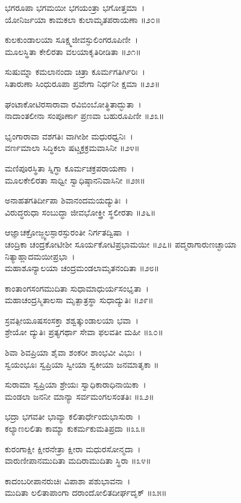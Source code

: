 	ಭಗರೂಪಾ ಭಗಮಯೀ ಭಗಯಂತ್ರಾ ಭಗೋತ್ತಮಾ~।\\
	ಯೋನಿರ್ಜಯಾ ಕಾಮಕಲಾ ಕುಲಾಮೃತಪರಾಯಣಾ ॥೨೦॥

ಕುಲಕುಂಡಾಲಯಾ ಸೂಕ್ಷ್ಮಜೀವಸ್ಫುಲಿಂಗರೂಪಿಣೀ~।\\
ಮೂಲಸ್ಥಿತಾ ಕೇಲಿರತಾ ವಲಯಾಕೃತಿರೀಡಿತಾ ॥೨೧॥

	ಸುಷುಮ್ನಾ ಕಮಲಾನಂದಾ ಚಿತ್ರಾ ಕೂರ್ಮಗತಿರ್ಗಿರಿಃ~।\\
	ಸಿತಾರುಣಾ ಸಿಂಧುರೂಪಾ ಪ್ರವೇಗಾ ನಿರ್ಧನೀ ಕ್ಷಮಾ ॥೨೨॥

ಘಂಟಾಕೋಟಿರಸಾರಾವಾ ರವಿಬಿಂಬೋತ್ಥಿತಾದ್ಭುತಾ~।\\
ನಾದಾಂತಲೀನಾ ಸಂಪೂರ್ಣಾ ಪ್ರಣವಾ ಬಹುರೂಪಿಣೀ ॥೨೩॥

	ಭೃಂಗಾರಾವಾ ವಶಗತಿಃ ವಾಗೀಶೀ ಮಧುರಧ್ವನಿಃ~।\\
	ವರ್ಣಮಾಲಾ ಸಿದ್ಧಿಕಲಾ ಷಟ್ಚಕ್ರಕ್ರಮವಾಸಿನೀ ॥೨೪॥

ಮಣಿಪೂರಸ್ಥಿತಾ ಸ್ನಿಗ್ಧಾ ಕೂರ್ಮಚಕ್ರಪರಾಯಣಾ~।\\
ಮೂಲಕೇಲಿರತಾ ಸಾಧ್ವೀ ಸ್ವಾಧಿಷ್ಠಾನನಿವಾಸಿನೀ ॥೨೫॥

	ಅನಾಹತಗತಿರ್ದೀಪಾ ಶಿವಾನಂದಮಯದ್ಯುತಿಃ~।\\
	ವಿರುದ್ಧರುಧಾ ಸಂಬುದ್ಧಾ ಜೀವಭೋಕ್ತ್ರೀ ಸ್ಥಲೀರತಾ ॥೨೬॥

ಆಜ್ಞಾಚಕ್ರೋಜ್ಜ್ವಲಸ್ಫಾರಸ್ಫುರಂತೀ ನಿರ್ಗತದ್ವಿಷಾ~।\\
ಚಂದ್ರಿಕಾ ಚಂದ್ರಕೋಟೀಶೀ ಸೂರ್ಯಕೋಟಿಪ್ರಭಾಮಯೀ ॥೨೭॥
\newpage
	ಪದ್ಮರಾಗಾರುಣಚ್ಛಾಯಾ ನಿತ್ಯಾಹ್ಲಾದಮಯೀಪ್ರಭಾ~।\\
	ಮಹಾಶೂನ್ಯಾಲಯಾ ಚಂದ್ರಮಂಡಲಾಮೃತನಂದಿತಾ ॥೨೮॥

ಕಾಂತಾಂಗಸಂಗಮುದಿತಾ ಸುಧಾಮಾಧುರ್ಯಸಂಭೃತಾ~।\\
ಮಹಾಚಂದ್ರಸ್ಮಿತಾಲಸಾ ಮೃತ್ಪಾತ್ರಸ್ಥಾ ಸುಧಾದ್ಯುತಿಃ ॥೨೯॥

	ಸ್ರವತ್ಪೀಯೂಷಸಂಸಕ್ತಾ ಶಶ್ವತ್ಕುಂಡಾಲಯಾ ಭವಾ~।\\
	ಶ್ರೇಯೋ ದ್ಯುತಿಃ ಪ್ರತ್ಯಗರ್ಥಾ ಸೇವಾ ಫಲವತೀ ಮಹೀ ॥೩೦॥

ಶಿವಾ ಶಿವಪ್ರಿಯಾ ಶೈವಾ ಶಂಕರೀ ಶಾಂಭವೀ ವಿಭುಃ~।\\
ಸ್ವಯಂಭೂಃ ಸ್ವಪ್ರಿಯಾ ಸ್ವೀಯಾ ಸ್ವಕೀಯಾ ಜನಮಾತೃಕಾ ॥

	ಸುರಾಮಾ ಸ್ವಪ್ರಿಯಾ ಶ್ರೇಯಃ ಸ್ವಾಧಿಕಾರಾಧಿನಾಯಿಕಾ~।\\
	ಮಂಡಲಾ ಜನನೀ ಮಾನ್ಯಾ ಸರ್ವಮಂಗಲಸಂತತಿಃ ॥೩೨॥

ಭದ್ರಾ ಭಗವತೀ ಭಾವ್ಯಾ ಕಲಿತಾರ್ಧೇಂದುಭಾಸುರಾ~।\\
ಕಲ್ಯಾಣಲಲಿತಾ ಕಾಮ್ಯಾ ಕುಕರ್ಮಕುಮತಿಪ್ರದಾ ॥೩೩॥

	ಕುರಂಗಾಕ್ಷೀ ಕ್ಷೀರನೇತ್ರಾ ಕ್ಷೀರಾ ಮಧುರಸೋನ್ಮದಾ~।\\
	ವಾರುಣೀಪಾನಮುದಿತಾ ಮದಿರಾಮುದಿತಾ ಸ್ಥಿರಾ ॥೩೪॥

ಕಾದಂಬರೀಪಾನರುಚಿಃ ವಿಪಾಶಾ ಪಶುಭಾವನಾ~।\\
ಮುದಿತಾ ಲಲಿತಾಪಾಂಗಾ ದರಾಂದೋಲಿತದೀರ್ಘದೃಕ್ ॥೩೫॥

